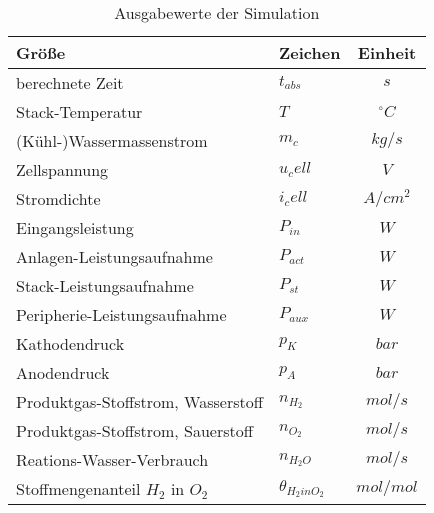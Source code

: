 \documentclass[onecolumn,10pt,titlepage]{article}
\begin{document}
\begin{table}[H]
	\caption{Ausgabewerte der Simulation}
	\begin{tabular}{llc}
		Größe&Zeichen&Einheit\\
		\hline
		\hline
		berechnete Zeit&$t_{abs}$ 	&$s$\\
		Stack-Temperatur&$T$ 		& $^\circ C$\\
		(Kühl-)Wassermassenstrom&$m_c$		&$kg/s$\\
		Zellspannung&$u_cell$	&$V$\\
		Stromdichte&$i_cell$	&$A/cm^2$\\
		Eingangsleistung&$P_{in}$	&$W$\\
		Anlagen-Leistungsaufnahme&$P_{act}$	&$W$\\
		Stack-Leistungsaufnahme&$P_{st}$	&$W$\\
		Peripherie-Leistungsaufnahme&$P_{aux}$	&$W$\\
		Kathodendruck&$p_K$		&$bar$\\
		Anodendruck&$p_A$		&$bar$\\
		Produktgas-Stoffstrom, Wasserstoff&$n_{H_2}$	&$mol/s$\\
		Produktgas-Stoffstrom, Sauerstoff & $n_{O_2}$		&$mol/s$\\
		Reations-Wasser-Verbrauch&$n_{H_{2}O}$&$mol/s$\\
		Stoffmengenanteil $H_2$ in $O_2$&$\theta_{H_2inO_2}$&$mol/mol$\\
		
	\end{tabular}
	\label{tab:mod_calc_Ausgabewerte}
\end{table}

  
 
\end{document}
